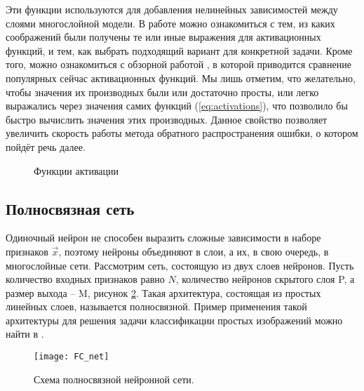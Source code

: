 \indent
\indent
Эти функции используются
для добавления нелинейных зависимостей между слоями многослойной модели.
В работе \cite{dl_nikolenko} можно ознакомиться с тем, из каких соображений
были получены те или иные выражения для активационных функций, и тем,
как выбрать подходящий вариант для конкретной задачи. Кроме того,
можно ознакомиться с обзорной работой \cite{activations}, в которой приводится
сравнение популярных сейчас активационных функций.
Мы лишь отметим, что желательно, чтобы
значения их производных были или достаточно просты,
или легко выражались через значения самих функций (\ref{eq:activations}), 
что позволило бы быстро вычислить значения этих производных. Данное 
свойство позволяет увеличить скорость работы метода
обратного распространения ошибки, о котором пойдёт речь далее.


\begin{figure}[h!]
	\begin{center}
	\end{center}
\caption{Функции активации}
\label{tikzpicture: activations}
\end{figure}

\subsection{Полносвязная сеть}

\indent
\indent
Одиночный нейрон не способен выразить сложные зависимости в наборе
признаков $\vec{x}$, поэтому нейроны объединяют в слои, а их, в свою 
очередь, в многослойные сети. Рассмотрим сеть,
состоящую из двух слоев нейронов. Пусть количество входных признаков
равно $N$, количество нейронов скрытого слоя P,
а размер выхода -- M, рисунок \ref{tikzpicture: fc_net}. Такая архитектура, 
состоящая из простых линейных слоев, называется полносвязной.
Пример применения такой архитектуры для решения задачи классификации
простых изображений можно найти в \cite{dl_nikolenko}.


\begin{figure}[h!]
    \begin{center}
   	    \texttt{[image: FC\_net]}
   	\end{center}
   	\caption{Схема полносвязной нейронной сети.}
   	\label{tikzpicture: fc_net}
\end{figure}

